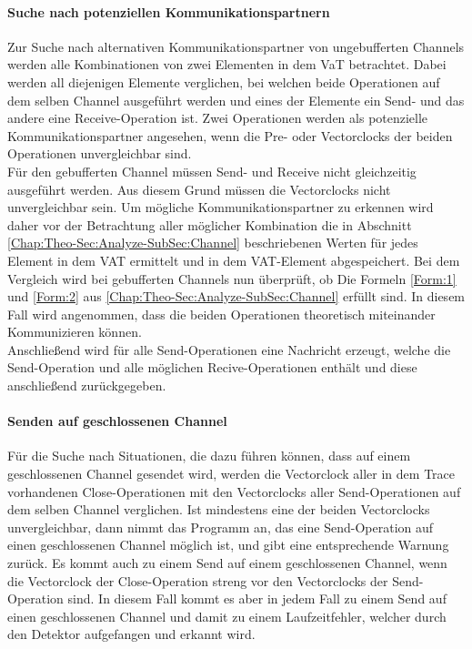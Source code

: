 \paragraph{Suche nach potenziellen Kommunikationspartnern}
Zur Suche nach alternativen Kommunikationspartner von ungebufferten Channels
werden alle Kombinationen
von zwei Elementen in dem VaT betrachtet. Dabei werden all diejenigen 
Elemente verglichen, bei welchen beide Operationen auf dem selben Channel 
ausgeführt werden und eines der 
Elemente ein Send- und das andere eine Receive-Operation ist. Zwei Operationen
werden als potenzielle Kommunikationspartner angesehen, wenn die Pre- oder
Vectorclocks der beiden 
Operationen unvergleichbar sind.\\
Für den gebufferten Channel müssen Send- und Receive nicht 
gleichzeitig ausgeführt werden. Aus diesem Grund müssen die Vectorclocks 
nicht unvergleichbar sein. Um mögliche Kommunikationspartner zu erkennen 
wird daher vor der Betrachtung aller möglicher Kombination
die in Abschnitt \ref{Chap:Theo-Sec:Analyze-SubSec:Channel} beschriebenen 
Werten für jedes Element in dem VAT ermittelt und in dem VAT-Element abgespeichert.
Bei dem Vergleich wird bei gebufferten Channels nun überprüft, 
ob Die Formeln \eqref{Form:1} und \eqref{Form:2} aus \ref{Chap:Theo-Sec:Analyze-SubSec:Channel}
erfüllt sind. In diesem Fall wird angenommen, dass die beiden Operationen 
theoretisch miteinander Kommunizieren können.\\
Anschließend wird für alle Send-Operationen eine Nachricht erzeugt, 
welche die Send-Operation und alle möglichen Recive-Operationen enthält und 
diese anschließend zurückgegeben.

\paragraph{Senden auf geschlossenen Channel}
Für die Suche nach Situationen, die dazu führen können, dass auf einem 
geschlossenen Channel gesendet wird, werden die Vectorclock aller in dem 
Trace vorhandenen Close-Operationen mit den Vectorclocks aller Send-Operationen
auf dem selben Channel verglichen. Ist mindestens eine der beiden Vectorclocks 
unvergleichbar, dann nimmt das Programm an, das eine Send-Operation auf 
einen geschlossenen Channel möglich ist, und gibt eine entsprechende 
Warnung zurück. Es kommt auch zu einem Send auf einem geschlossenen Channel, 
wenn die Vectorclock der Close-Operation streng vor den Vectorclocks 
der Send-Operation sind. In diesem Fall kommt es aber in jedem Fall zu einem 
Send auf einen geschlossenen Channel und damit zu einem Laufzeitfehler, 
welcher durch den Detektor aufgefangen und erkannt wird.

